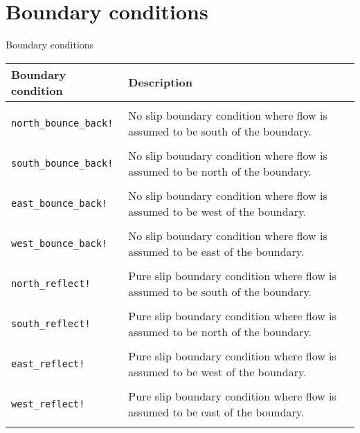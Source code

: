 \documentclass[pdf]{beamer}
\begin{document}
\section{Boundary conditions}

\begin{frame}{Boundary conditions}
\begin{table}
    \tiny
    \centering
    \begin{tabularx}{\textwidth}{l X}
      \textbf{Boundary condition} & \textbf{Description} \\
      \hline \\
      \texttt{north\_bounce\_back!} & No slip boundary condition where flow is assumed to be south of the boundary. \\
      \\
      \texttt{south\_bounce\_back!} & No slip boundary condition where flow is assumed to be north of the boundary. \\
      \\
      \texttt{east\_bounce\_back!} & No slip boundary condition where flow is assumed to be west of the boundary. \\
      \\
      \texttt{west\_bounce\_back!} & No slip boundary condition where flow is assumed to be east of the boundary. \\
      \\
      \texttt{north\_reflect!} & Pure slip boundary condition where flow is assumed to be south of the boundary. \\
      \\
      \texttt{south\_reflect!} & Pure slip boundary condition where flow is assumed to be north of the boundary. \\
      \\
      \texttt{east\_reflect!} & Pure slip boundary condition where flow is assumed to be west of the boundary. \\
      \\
      \texttt{west\_reflect!} & Pure slip boundary condition where flow is assumed to be east of the boundary. \\
      \\
    \end{tabularx}
  \end{table}
\end{frame}
\end{document}

